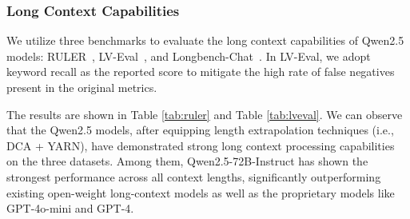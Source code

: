\subsubsection{Long Context Capabilities}

We utilize three benchmarks to evaluate the long context capabilities of Qwen2.5 models: RULER~\citep{hsieh2024ruler}, LV-Eval~\citep{yuan2024lveval}, and Longbench-Chat~\citep{longalign2024bai}. In LV-Eval, we adopt keyword recall as the reported score to mitigate the high rate of false negatives present in the original metrics.




The results are shown in Table \ref{tab:ruler} and Table \ref{tab:lveval}. We can observe that the Qwen2.5 models, after equipping length extrapolation techniques (i.e., DCA + YARN), have demonstrated strong long context processing capabilities on the three datasets. Among them, Qwen2.5-72B-Instruct has shown the strongest performance across all context lengths, significantly outperforming existing open-weight long-context models as well as the proprietary models like GPT-4o-mini and GPT-4.

